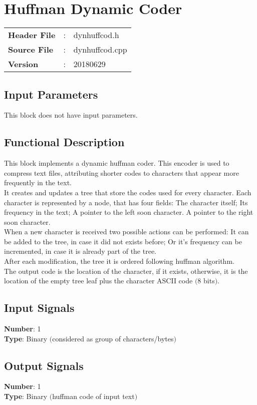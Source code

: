 \clearpage

\section{Huffman Dynamic Coder}

\begin{tcolorbox}	
\begin{tabular}{p{2.75cm} p{0.2cm} p{10.5cm}} 	
\textbf{Header File}   &:& dynhuffcod.h \\
\textbf{Source File}   &:& dynhuffcod.cpp \\
\textbf{Version}       &:& 20180629
\end{tabular}
\end{tcolorbox}

\subsection*{Input Parameters}

This block does not have input parameters.

\subsection*{Functional Description}

This block implements a dynamic huffman coder. This encoder is used to compress text files, attributing shorter codes to characters that appear more frequently in the text.\\
It creates and updates a tree that store the codes used for every character. Each character is represented by a node, that has four fields: The character itself; Its frequency in the text; A pointer to the left soon character. A pointer to the right soon character. \\
When a new character is received two possible actions can be performed: It can be added to the tree, in case it did not exists before; Or it's frequency can be incremented, in case it is already part of the tree. \\
After each modification, the tree it is ordered following huffman algorithm.\\
The output code is the location of the character, if it exists, otherwise, it is the location of the empty tree leaf plus the character ASCII code $($8 bits$)$.

\subsection*{Input Signals}

\textbf{Number}: 1\\
\textbf{Type}: Binary $($considered as group of characters/bytes$)$

\subsection*{Output Signals}

\textbf{Number}: 1\\
\textbf{Type}: Binary $($huffman code of input text$)$

%
